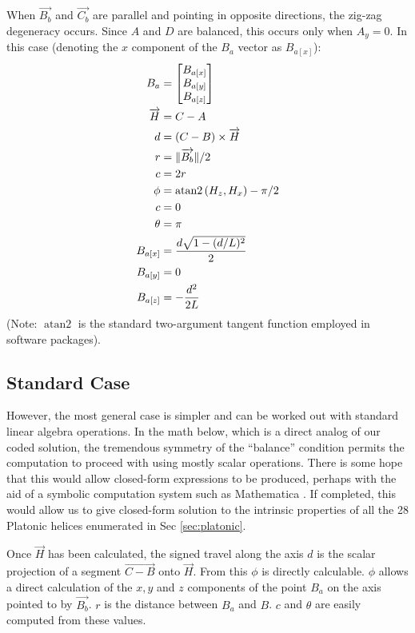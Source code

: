 \documentclass[mathematics,article,submit,pdftex,moreauthors]{Definitions/mdpi}
\DeclareMathOperator{\atantwo}{atan2}
\DeclarePairedDelimiter{\norm}{\lVert}{\rVert}
\begin{document}
When $\overrightarrow{B_b}$ and $\overrightarrow{C_b}$ are parallel and pointing in opposite directions,
the zig-zag degeneracy occurs. Since
$A$ and $D$ are balanced, this occurs only when $A_y = 0$.
In this case (denoting the $x$ component of the $B_a$ vector as $B_{a[x]}$):
\begin{align}
  B_{a} &= \begin{bmatrix} B_{a[x]} \\ B_{a[y]} \\ B_{a[z]}  \end{bmatrix} \\
  \overrightarrow{H} &=  C - A \\
  d &= (C - B) \times \overrightarrow{H} \\
  r &= \norm{\overrightarrow{B_b}} / 2 \\
  c &= 2 r\\
  \phi &= \atantwo{(H_z,H_x)} - \pi/2 \\
  c &= 0 \\
  \theta &= \pi \\
  B_{a[x]} &= \frac{d\sqrt{1 - (d/L)^2}}{2} \\
  B_{a[y]} &= 0 \\
  B_{a[z]} &= -\frac{d^2}{2L}
\end{align}
(Note: $\atantwo$ is the standard two-argument tangent function employed in software packages).

\subsection{Standard Case}

However, the most general case is simpler and can be worked
out with standard linear algebra operations. In the math below,
which is a direct analog of our coded solution, the tremendous symmetry of the ``balance'' condition
permits the computation to proceed with
using mostly scalar operations. There is some hope that
this would allow closed-form expressions to be produced, perhaps
with the aid of a symbolic computation system such as
Mathematica \cite{Mathematica}. If completed, this would
allow us to give closed-form solution to the intrinsic properties
of all the 28 Platonic helices enumerated in Sec \ref{sec:platonic}.

Once $\overrightarrow{H}$ has been calculated, the signed travel along the axis $d$ is
the scalar projection of a segment $\overrightarrow{C - B}$ onto $\overrightarrow{H}$.
From this $\phi$ is directly calculable. $\phi$ allows
a direct calculation of the $x,y$ and $z$ components of the
point $B_a$ on the axis pointed to by $\overrightarrow{B_b}$.
$r$ is the distance between $B_a$ and $B$. $c$ and $\theta$
are easily computed from these values.
\end{document}
